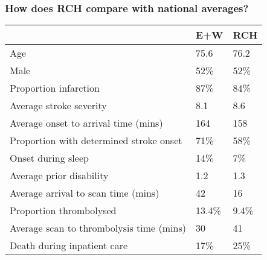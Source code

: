 \begin{frame}
\frametitle{How does RCH compare with national averages?}

\begin{table}[]
\begin{tabular}{lll}
                                         & E+W    & RCH   \\
\hline
Age                                      & 75.6   & 76.2  \\
Male                                     & 52\%   & 52\%  \\
Proportion infarction                    & 87\%   & 84\%  \\
Average stroke severity                  & 8.1    & 8.6   \\
Average onset to arrival time (mins)     & 164    & 158   \\
Proportion with determined stroke onset  & 71\%   & 58\%  \\
Onset during sleep                       & 14\%   & 7\%   \\
Average prior disability                 & 1.2    & 1.3   \\
Average arrival to scan time (mins)      & 42     & 16    \\
Proportion thrombolysed                  & 13.4\% & 9.4\% \\
Average scan to thrombolysis time (mins) & 30     & 41    \\
Death during inpatient care              & 17\%   & 25\% 
\end{tabular}
\end{table}

\end{frame}